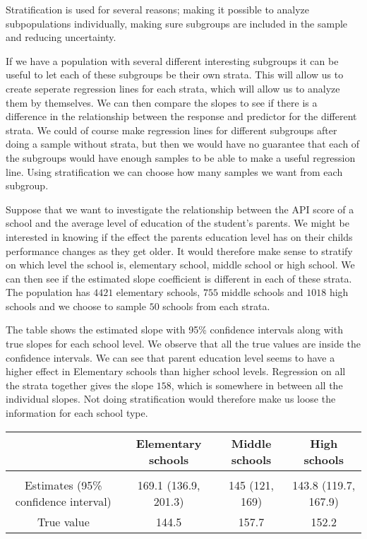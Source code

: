 \documentclass{article}
\begin{document}
Stratification is used for several reasons; making it possible to analyze
subpopulations individually, making sure subgroups are included in the sample
and reducing uncertainty.

If we have a population with several different interesting subgroups it can be
useful to let each of these subgroups be their own strata. This will allow us to
create seperate regression lines for each strata, which will allow us to
analyze them by themselves. We can then compare the slopes to see if there is a difference in the relationship between the
response and predictor for the different strata. We could of course make
regression lines for different subgroups after doing a sample without strata,
but then we would have no guarantee that each of the subgroups would have enough
samples to be able to make a useful regression line. Using stratification we can
choose how many samples we want from each subgroup.

\begin{example}
  Suppose that we want to investigate the relationship between the API score of
  a school and the average level of education of the student's parents. We might
  be interested in knowing if the effect the parents education level has on
  their childs performance changes as they get older. It would therefore make
  sense to stratify on which level the school is, elementary school, middle
  school or high school. We can then see if the estimated slope coefficient is
  different in each of these strata.
  The population has \(4421\) elementary schools, \(755\) middle schools and
  \(1018\) high schools and we choose to sample \(50\) schools from each strata.

  The table shows the estimated slope with 95\% confidence intervals along with
  true slopes for each school level. We observe that all the true values are
  inside the confidence intervals. We can see that
  parent education level seems to have a higher effect in Elementary schools
  than higher school levels. Regression on all the strata together gives the
  slope \(158\), which is somewhere in between all the individual slopes. Not
  doing stratification would therefore make us loose the information for each
  school type.

  \begin{center}
  \begin{tabular}{c|ccc}
    & Elementary schools & Middle schools & High schools \\
    \hline \\
    Estimates (95\% confidence interval) & 169.1 (136.9, 201.3) & 145 (121, 169) & 143.8 (119.7, 167.9) \\
    True value & 144.5 & 157.7 & 152.2
  \end{tabular}
  \end{center}
\end{example}
\end{document}
